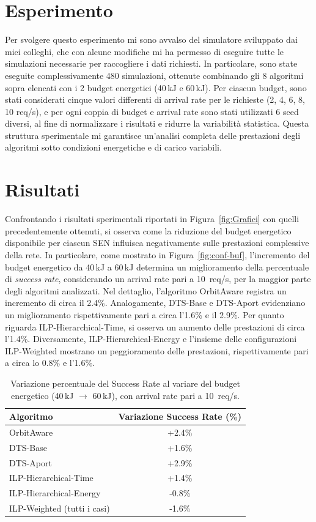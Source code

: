 \documentclass[12pt]{article}
\begin{document}
\section{Esperimento}

Per svolgere questo esperimento mi sono avvalso del simulatore sviluppato dai miei colleghi, che con alcune modifiche mi ha permesso di eseguire tutte le simulazioni necessarie per raccogliere i dati richiesti.  
In particolare, sono state eseguite complessivamente 480 simulazioni, ottenute combinando gli 8 algoritmi sopra elencati con i 2 budget energetici (40\,kJ e 60\,kJ).  
Per ciascun budget, sono stati considerati cinque valori differenti di arrival rate per le richieste (2, 4, 6, 8, 10 req/s), e per ogni coppia di budget e arrival rate sono stati utilizzati 6 seed diversi, al fine di normalizzare i risultati e ridurre la variabilità statistica.  
Questa struttura sperimentale mi garantisce un’analisi completa delle prestazioni degli algoritmi sotto condizioni energetiche e di carico variabili.

\section{Risultati}

Confrontando i risultati sperimentali riportati in Figura~\ref{fig:Grafici} con quelli precedentemente ottenuti, si osserva come la riduzione del budget energetico disponibile per ciascun SEN influisca negativamente sulle prestazioni complessive della rete. In particolare, come mostrato in Figura~\ref{fig:conf-buf}, l’incremento del budget energetico da 40\,kJ a 60\,kJ determina un miglioramento della percentuale di \emph{success rate}, considerando un arrival rate pari a 10~req/s, per la maggior parte degli algoritmi analizzati. Nel dettaglio, l’algoritmo OrbitAware registra un incremento di circa il 2.4\%. Analogamente, DTS-Base e DTS-Aport evidenziano un miglioramento rispettivamente pari a circa l’1.6\% e il 2.9\%. Per quanto riguarda ILP-Hierarchical-Time, si osserva un aumento delle prestazioni di circa l’1.4\%. Diversamente, ILP-Hierarchical-Energy e l’insieme delle configurazioni ILP-Weighted mostrano un peggioramento delle prestazioni, rispettivamente pari a circa lo 0.8\% e l’1.6\%.

\begin{table}[h]
\centering

\label{tab:energy_variation}
\begin{tabular}{l c}
\hline
\textbf{Algoritmo} & \textbf{Variazione Success Rate (\%)} \\
\hline
OrbitAware & +2.4\% \\
DTS-Base & +1.6\% \\
DTS-Aport & +2.9\% \\
ILP-Hierarchical-Time & +1.4\% \\
ILP-Hierarchical-Energy & -0.8\% \\
ILP-Weighted (tutti i casi) & -1.6\% \\
\hline
\end{tabular}
\caption{Variazione percentuale del Success Rate al variare del budget energetico (40\,kJ $\rightarrow$ 60\,kJ), con arrival rate pari a 10~req/s.}
\end{table}
\end{document}
